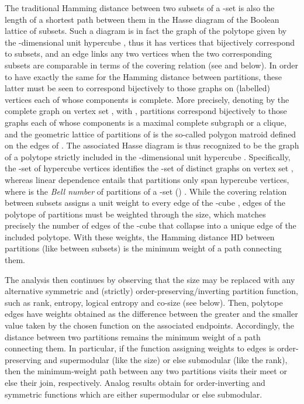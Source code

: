 \documentclass[a4paper,10pt]{article}
\begin{document}
The traditional Hamming distance between two subsets of a -set is also the length of a shortest path between them in the Hasse diagram of the Boolean lattice of subsets.
Such a diagram is in fact the graph of the polytope \cite{BronstedConvex,Branko2001} given by the -dimensional unit hypercube , thus it has  vertices that
bijectively correspond to subsets, and an edge links any two vertices when the two corresponding subsets are comparable in terms of the covering relation (see
\cite{Bollobas86,AlgeGraph} and below). In order to have exactly the same for the Hamming distance between partitions, these latter must be seen to correspond bijectively to
those graphs on  (labelled) vertices each of whose components is complete. More precisely, denoting by  the complete graph on vertex set ,
with , partitions correspond bijectively to those graphs  each of whose components is a maximal complete subgraph or
a clique, and the geometric lattice of partitions of  is the so-called polygon matroid defined on the edges of  \cite[pp. 54, 259]{Aigner79}. The associated Hasse
diagram is thus recognized to be the graph of a polytope strictly included in the -dimensional unit hypercube . Specifically, the
-set  of hypercube vertices identifies the -set of distinct graphs on vertex set , whereas linear dependence
\cite{Whitney1935} entails that partitions only span  hypercube vertices, where  is the \textit{Bell number} of partitions of a
-set () \cite{Aigner79,GrahamKnuth+1994,Rota1964}. While the covering relation between subsets assigns a unit weight to every edge of the -cube \cite{Sebo+04},
edges of the polytope of partitions must be weighted through the size, which matches precisely the number of edges of the -cube that collapse into a unique
edge of the included polytope. With these weights, the Hamming distance HD between partitions (like between subsets) is the minimum weight of a path connecting them.

The analysis then continues by observing that the size may be replaced with any alternative symmetric and (strictly) order-preserving/inverting partition function, such as
rank, entropy, logical entropy \cite{EllermanLogicalEntropy,EllermanLogic} and co-size (see below). Then, polytope edges have weights obtained as the difference between the
greater and the smaller value taken by the chosen function on the associated endpoints. Accordingly, the distance between two partitions remains the minimum weight of a path
connecting them. In particular, if the function assigning weights to edges is order-preserving and supermodular (like the size) or else submodular (like the rank), then the
minimum-weight path between any two partitions visits their meet or else their join, respectively. Analog results obtain for order-inverting and symmetric functions which
are either supermodular or else submodular.
\end{document}
